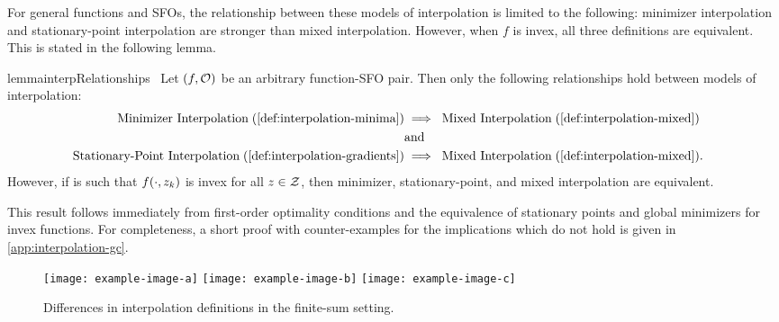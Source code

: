 For general functions and SFOs, the relationship between these models of interpolation is limited to the following: minimizer interpolation and stationary-point interpolation are stronger than mixed interpolation. 
However, when \( f \) is invex, all three definitions are equivalent.
This is stated in the following lemma.
\begin{restatable}{lemma}{interpRelationships}~\label{thm:interp-relationships}
    Let \( \rbr{f, \oracle{}} \) be an arbitrary function-SFO pair. 
    Then only the following relationships hold between models of interpolation:
    \begin{align*}
        \text{Minimizer Interpolation} \; (\autoref{def:interpolation-minima}) &\implies \; \text{Mixed Interpolation} \; (\autoref{def:interpolation-mixed})\\
                                                                               & \text{and} &\\
        \text{Stationary-Point Interpolation} \; (\autoref{def:interpolation-gradients}) &\implies \; \text{Mixed Interpolation} \; (\autoref{def:interpolation-mixed}).
    \end{align*}
    However, if \oracle{} is such that \( f(\cdot, \zk) \) is invex for all \( \z \in \calZ \), then minimizer, stationary-point, and mixed interpolation are equivalent.
\end{restatable}
This result follows immediately from first-order optimality conditions and the equivalence of stationary points and global minimizers for invex functions.
For completeness, a short proof with counter-examples for the implications which do not hold is given in \autoref{app:interpolation-gc}.

\begin{figure}[]
    \centering
    \texttt{[image: example-image-a]}
    \texttt{[image: example-image-b]}
    \texttt{[image: example-image-c]}
    \caption{Differences in interpolation definitions in the finite-sum setting.}%
    \label{fig:interpolation-types}
\end{figure}

